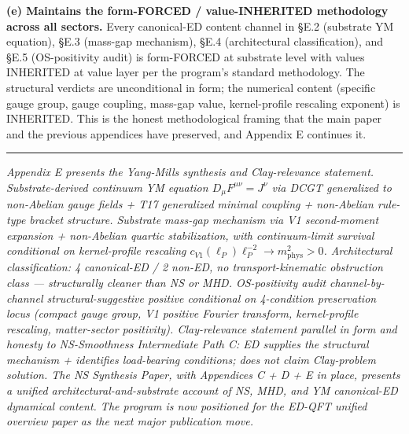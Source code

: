 \documentclass[
  11pt,a4paper]{article}
\begin{document}
\textbf{(e) Maintains the form-FORCED / value-INHERITED methodology
across all sectors.} Every canonical-ED content channel in §E.2
(substrate YM equation), §E.3 (mass-gap mechanism), §E.4 (architectural
classification), and §E.5 (OS-positivity audit) is form-FORCED at
substrate level with values INHERITED at value layer per the program's
standard methodology. The structural verdicts are unconditional in form;
the numerical content (specific gauge group, gauge coupling, mass-gap
value, kernel-profile rescaling exponent) is INHERITED. This is the
honest methodological framing that the main paper and the previous
appendices have preserved, and Appendix E continues it.

\begin{center}\rule{0.5\linewidth}{0.5pt}\end{center}

\emph{Appendix E presents the Yang-Mills synthesis and Clay-relevance
statement. Substrate-derived continuum YM equation
\(D_\mu F^{\mu\nu} = J^\nu\) via DCGT generalized to non-Abelian gauge
fields + T17 generalized minimal coupling + non-Abelian rule-type
bracket structure. Substrate mass-gap mechanism via V1 second-moment
expansion + non-Abelian quartic stabilization, with continuum-limit
survival conditional on kernel-profile rescaling
\(c_{V1}(\ell_P)\ell_P^{-2} \to m_\mathrm{phys}^2 > 0\). Architectural
classification: 4 canonical-ED / 2 non-ED, no transport-kinematic
obstruction class --- structurally cleaner than NS or MHD. OS-positivity
audit channel-by-channel structural-suggestive positive conditional on
4-condition preservation locus (compact gauge group, V1 positive Fourier
transform, kernel-profile rescaling, matter-sector positivity).
Clay-relevance statement parallel in form and honesty to NS-Smoothness
Intermediate Path C: ED supplies the structural mechanism + identifies
load-bearing conditions; does not claim Clay-problem solution. The NS
Synthesis Paper, with Appendices C + D + E in place, presents a unified
architectural-and-substrate account of NS, MHD, and YM canonical-ED
dynamical content. The program is now positioned for the ED-QFT unified
overview paper as the next major publication move.}
\end{document}

